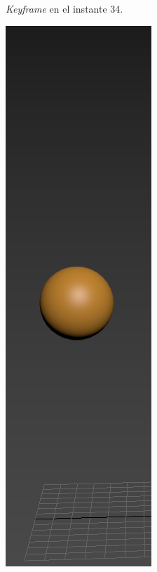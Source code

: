\documentclass{article}
\begin{document}
\begin{figure}[H]
\begin{subfigure}[H]{0.15\textwidth}
	    \caption{\textit{Keyframe} en el instante 34.}
	\end{subfigure}
    \hfill
	\begin{subfigure}[H]{0.15\textwidth}
	    \centering
	    \includegraphics[width=\textwidth]{imagenes/Ejercicio 2/p1_39.png}

\end{subfigure}
\end{figure}
\end{document}
